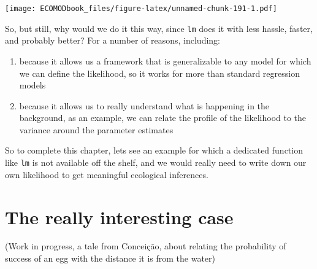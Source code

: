 \documentclass[
]{book}
\newenvironment{Shaded}{\begin{snugshade}}{\end{snugshade}}
\newcommand{\DataTypeTok}[1]{\textcolor[rgb]{0.13,0.29,0.53}{#1}}
\newcommand{\DecValTok}[1]{\textcolor[rgb]{0.00,0.00,0.81}{#1}}
\newcommand{\KeywordTok}[1]{\textcolor[rgb]{0.13,0.29,0.53}{\textbf{#1}}}
\newcommand{\NormalTok}[1]{#1}
\newcommand{\OperatorTok}[1]{\textcolor[rgb]{0.81,0.36,0.00}{\textbf{#1}}}
\newcommand{\StringTok}[1]{\textcolor[rgb]{0.31,0.60,0.02}{#1}}
\providecommand{\tightlist}{%
  \setlength{\itemsep}{0pt}\setlength{\parskip}{0pt}}
\begin{document}
\begin{Shaded}
\end{Shaded}

\texttt{[image: ECOMODbook\_files/figure-latex/unnamed-chunk-191-1.pdf]}

So, but still, why would we do it this way, since \texttt{lm} does it with less hassle, faster, and probably better? For a number of reasons, including:

\begin{enumerate}
\def\labelenumi{\arabic{enumi}.}
\tightlist
\item
  because it allows us a framework that is generalizable to any model for which we can define the likelihood, so it works for more than standard regression models
\item
  because it allows us to really understand what is happening in the background, as an example, we can relate the profile of the likelihood to the variance around the parameter estimates
\end{enumerate}

So to complete this chapter, lets see an example for which a dedicated function like \texttt{lm} is not available off the shelf, and we would really need to write down our own likelihood to get meaningful ecological inferences.

\hypertarget{the-really-interesting-case}{%
\section{The really interesting case}\label{the-really-interesting-case}}

(Work in progress, a tale from Conceição, about relating the probability of success of an egg with the distance it is from the water)
\end{document}

